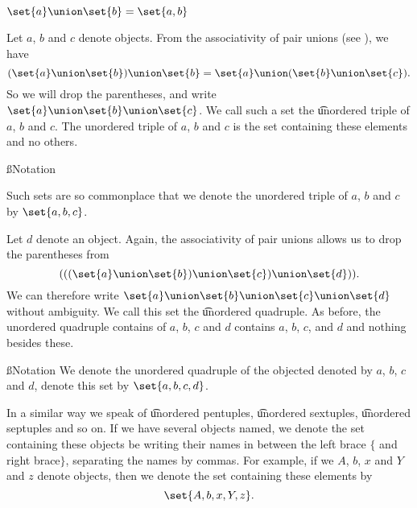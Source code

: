 

$\set{a} \union \set{b} = \set{a, b}$


Let $a$, $b$ and $c$ denote objects.
From the associativity of pair unions (see ), we have
\[
  (\set{a} \union \set{b}) \union \set{b} = \set{a} \union (\set{b} \union \set{c}).
\]
So we will drop the parentheses, and write $\set{a} \union \set{b} \union \set{c}$.
We call such a set the \t{unordered triple} of $a$, $b$ and $c$.
The unordered triple of $a$, $b$ and $c$ is the set containing these elements and no others.

\ss{Notation}

Such sets are so commonplace that we denote the unordered triple of $a$, $b$ and $c$ by $\set{a, b, c}$.


Let $d$ denote an object.
Again, the associativity of pair unions allows us to drop the parentheses from 
\[
  (((\set{a} \union \set{b}) \union \set{c}) \union \set{d})).
\]
We can therefore write $\set{a} \union \set{b} \union \set{c} \union \set{d}$ without ambiguity.
We call this set the \t{unordered quadruple}.
As before, the unordered quadruple contains of $a$, $b$, $c$ and $d$ contains $a$, $b$, $c$, and $d$ and nothing besides these.

\ss{Notation} 
We denote the unordered quadruple of the objected denoted by $a$, $b$, $c$ and $d$, denote this set by $\set{a, b, c, d}$.


In a similar way we speak of \t{unordered pentuples}, \t{unordered sextuples}, \t{unordered septuples} and so on.
If we have several objects named, we denote the set containing these objects be writing their names in between the left brace $\{$ and right brace$\}$, separating the names by commas.
For example, if we $A$, $b$, $x$ and $Y$ and $z$ denote objects, then we denote the set containing these elements by
\[
	\set{A, b, x, Y, z}.
\]